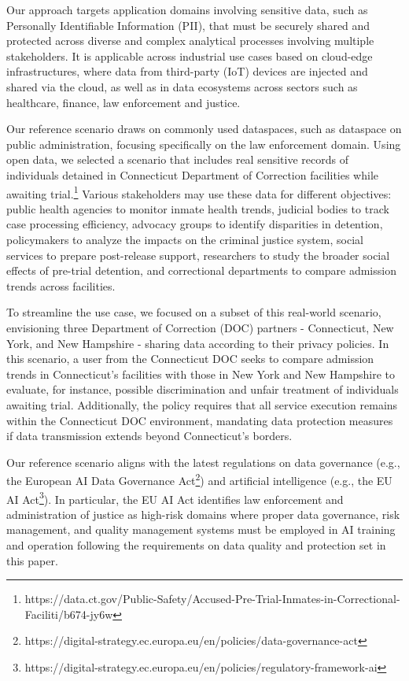 {\color{OurColor}
Our approach targets application domains involving sensitive data, such as Personally Identifiable Information (PII), that must be securely shared and protected across diverse and complex analytical processes involving multiple stakeholders. It is applicable across industrial use cases based on cloud-edge infrastructures, where data from third-party (IoT) devices are injected and shared via the cloud, as well as in data ecosystems across sectors such as healthcare, finance, law enforcement and justice.

Our reference scenario draws on commonly used dataspaces, such as dataspace on public administration, focusing specifically on the law enforcement domain. Using open data, we selected a scenario that includes real sensitive records of individuals detained in Connecticut Department of Correction facilities while awaiting trial.\footnote{https://data.ct.gov/Public-Safety/Accused-Pre-Trial-Inmates-in-Correctional-Faciliti/b674-jy6w} Various stakeholders may use these data for different objectives: public health agencies to monitor inmate health trends, judicial bodies to track case processing efficiency, advocacy groups to identify disparities in detention, policymakers to analyze the impacts on the criminal justice system, social services to prepare post-release support, researchers to study the broader social effects of pre-trial detention, and correctional departments to compare admission trends across facilities.

To streamline the use case, we focused on a subset of this real-world scenario, envisioning three Department of Correction (DOC) partners - Connecticut, New York, and New Hampshire - sharing data according to their privacy policies. In this scenario, a user from the Connecticut DOC seeks to compare admission trends in Connecticut’s facilities with those in New York and New Hampshire to evaluate, for instance, possible discrimination and unfair treatment of individuals awaiting trial. Additionally, the policy requires that all service execution remains within the Connecticut DOC environment, mandating data protection measures if data transmission extends beyond Connecticut’s borders.

Our reference scenario aligns with the latest regulations on data governance (e.g., the European AI Data Governance Act\footnote{https://digital-strategy.ec.europa.eu/en/policies/data-governance-act}) and artificial intelligence (e.g., the EU AI Act\footnote{https://digital-strategy.ec.europa.eu/en/policies/regulatory-framework-ai}). In particular, the EU AI Act identifies law enforcement and administration of justice as high-risk domains where proper data governance, risk management, and quality management systems must be employed in AI training and operation following the requirements on data quality and protection set in this paper.}

